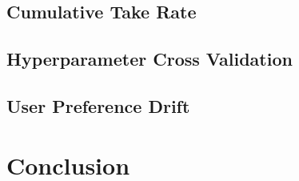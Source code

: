 \documentclass{article}
\begin{document}
\subsection{Cumulative Take Rate}

\subsection{Hyperparameter Cross Validation}

\subsection{User Preference Drift}

\section{Conclusion}

\nocite{kawale2015efficient}
\nocite{wang2017online}
\nocite{zhao2013interactive}
\nocite{cherkassky2013sequential}
\nocite{arulampalam2002tutorial}
\nocite{douc2005comparison}



\end{document}

